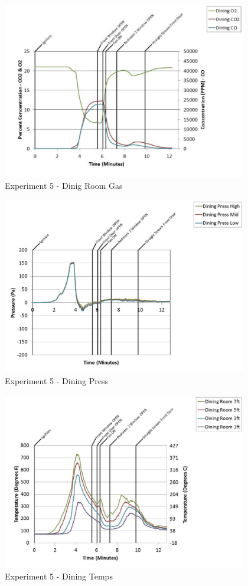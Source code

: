 \documentclass{article}
\begin{document}
\begin{appendices}
	\begin{figure}[h!]
		\centering
		\includegraphics[height=3.05in]{0_Images/Results_Charts/Exp_5_Charts/DinigRoomGas.pdf}
		\caption{Experiment 5 - Dinig Room Gas}
	\end{figure}
 
	\clearpage

	\begin{figure}[h!]
		\centering
		\includegraphics[height=3.05in]{0_Images/Results_Charts/Exp_5_Charts/DiningPress.pdf}
		\caption{Experiment 5 - Dining Press}
	\end{figure}
 

	\begin{figure}[h!]
		\centering
		\includegraphics[height=3.05in]{0_Images/Results_Charts/Exp_5_Charts/DiningTemps.pdf}
		\caption{Experiment 5 - Dining Temps}
	\end{figure}
 

\end{appendices}
\end{document}
